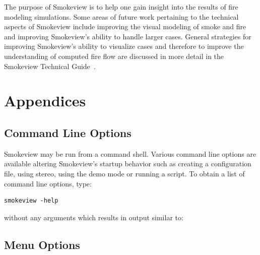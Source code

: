 \documentclass[11pt,twoside]{book}
\begin{document}
The purpose of Smokeview is to help one gain insight into the results
of fire modeling simulations.
Some areas of future work pertaining to the technical aspects of
Smokeview include improving the visual modeling of smoke and fire
and improving Smokeview's ability to handle larger cases.
General strategies for improving Smokeview's ability to visualize
cases and therefore to improve the understanding of computed fire
flow are discussed in more detail in the
Smokeview Technical Guide~\cite{Smokeview_Tech_Guide}.






\part{Appendices}
\appendix
{}


\chapter{Command Line Options}
\label{sectioncommand} Smokeview may be run from a command shell.
Various command line options are available altering Smokeview's
startup behavior such as creating a configuration file, using
stereo, using the demo mode or running a script. To obtain a list
of command line options, type:
\begin{lstlisting}
smokeview -help
\end{lstlisting}
\noindent without any arguments which results in output similar to:\\




\chapter{Menu Options}
\label{sectionmenu}
\end{document}
